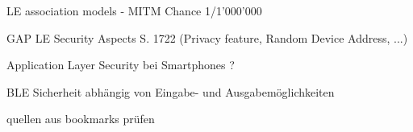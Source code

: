 LE association models
    - MITM Chance 1/1'000'000

GAP LE Security Aspects S. 1722 (Privacy feature, Random Device Address, ...)

Application Layer Security bei Smartphones ?

BLE Sicherheit abhängig von Eingabe- und Ausgabemöglichkeiten

quellen aus bookmarks prüfen